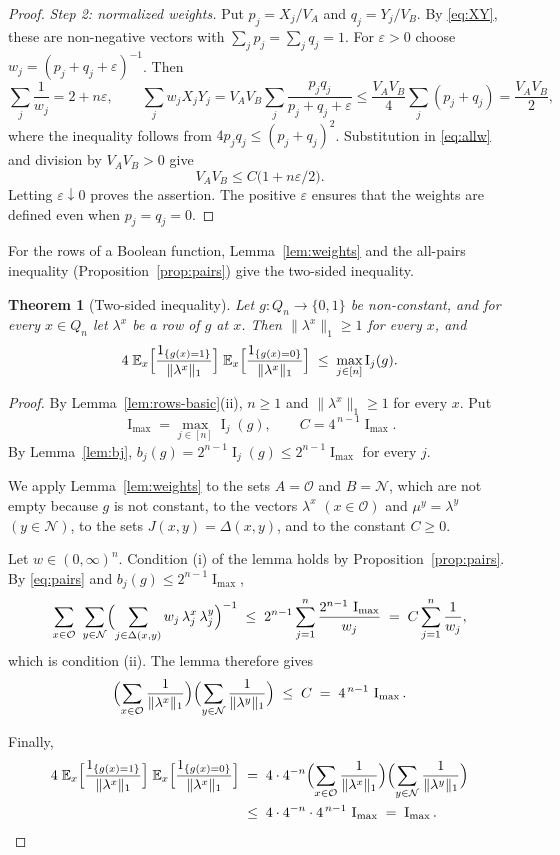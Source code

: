 \documentclass[11pt,reqno]{amsart}
\newtheorem{theorem}{Theorem}[section]
\theoremstyle{definition}
\theoremstyle{remark}
\numberwithin{equation}{section}
\theoremstyle{named}
\theoremstyle{plain}
\newcommand{\E}{\mathbb{E}}
\newcommand{\I}{\operatorname{I}}
\newcommand{\cO}{\mathcal{O}}
\newcommand{\cN}{\mathcal{N}}
\newcommand{\eps}{\varepsilon}
\newcommand{\norm}[1]{\lVert #1\rVert_1}
\begin{document}
\begin{proof}
\smallskip
\emph{Step 2: normalized weights.} Put $p_j=X_j/V_A$ and $q_j=Y_j/V_B$. By
\eqref{eq:XY}, these are non-negative vectors with $\sum_jp_j=\sum_jq_j=1$.
For $\eps>0$ choose $w_j=(p_j+q_j+\eps)^{-1}$. Then
\[
   \sum_j\frac1{w_j}=2+n\eps,\qquad
   \sum_jw_jX_jY_j
   =V_AV_B\sum_j\frac{p_jq_j}{p_j+q_j+\eps}
   \le\frac{V_AV_B}{4}\sum_j(p_j+q_j)=\frac{V_AV_B}{2},
\]
where the inequality follows from $4p_jq_j\le(p_j+q_j)^2$.
Substitution in \eqref{eq:allw} and division by $V_AV_B>0$ give
\[
   V_AV_B\le C\bigl(1+n\eps/2\bigr).
\]
Letting $\eps\downarrow0$ proves the assertion. The positive $\eps$ ensures that the weights
are defined even when $p_j=q_j=0$.
\end{proof}

For the rows of a Boolean function, Lemma~\ref{lem:weights} and the all-pairs inequality (Proposition~\ref{prop:pairs}) give the two-sided
inequality.

\begin{theorem}[Two-sided inequality]\label{thm:two}
Let $g\colon Q_n\to\{0,1\}$ be non-constant, and for every $x\in Q_n$ let $\lambda^{x}$ be a row of
$g$ at $x$. Then $\norm{\lambda^{x}}\ge1$ for every $x$, and
\[
   4\;\E_x\Bigl[\frac{1_{\{g(x)=1\}}}{\norm{\lambda^{x}}}\Bigr]\;
      \E_x\Bigl[\frac{1_{\{g(x)=0\}}}{\norm{\lambda^{x}}}\Bigr]\;\le\;\max_{j\in[n]}\I_j(g).
\]
\end{theorem}

\begin{proof}
By Lemma~\ref{lem:rows-basic}(ii), $n\ge1$ and $\norm{\lambda^{x}}\ge1$ for every $x$. Put
\[
   \I_{\max}=\max_{j\in[n]}\I_j(g),\qquad C=4^{\,n-1}\I_{\max} .
\]
By Lemma~\ref{lem:bj}, $b_j(g)=2^{n-1}\I_j(g)\le2^{n-1}\I_{\max}$ for every $j$.

We apply Lemma~\ref{lem:weights} to the sets $A=\cO$ and $B=\cN$, which are not empty because $g$
is not constant, to the vectors $\lambda^{x}$ $(x\in\cO)$ and $\mu^{y}=\lambda^{y}$ $(y\in\cN)$, to
the sets $J(x,y)=\Delta(x,y)$, and to the constant $C\ge0$.

Let $w\in(0,\infty)^{n}$. Condition (i) of
the lemma holds by Proposition~\ref{prop:pairs}. By \eqref{eq:pairs} and
$b_j(g)\le2^{n-1}\I_{\max}$,
\[
   \sum_{x\in\cO}\ \sum_{y\in\cN}\Bigl(\sum_{j\in\Delta(x,y)}w_j\,\lambda^{x}_j\,\lambda^{y}_j\Bigr)^{-1}
   \;\le\;2^{n-1}\sum_{j=1}^{n}\frac{2^{n-1}\,\I_{\max}}{w_j}\;=\;C\sum_{j=1}^{n}\frac1{w_j},
\]
which is condition (ii). The lemma therefore gives
\[
   \Bigl(\sum_{x\in\cO}\frac1{\norm{\lambda^{x}}}\Bigr)
   \Bigl(\sum_{y\in\cN}\frac1{\norm{\lambda^{y}}}\Bigr)\;\le\;C\;=\;4^{\,n-1}\,\I_{\max}.
\]

Finally,
\begin{align*}
   4\;\E_x\Bigl[\frac{1_{\{g(x)=1\}}}{\norm{\lambda^{x}}}\Bigr]\;
      \E_x\Bigl[\frac{1_{\{g(x)=0\}}}{\norm{\lambda^{x}}}\Bigr]
   &\;=\;4\cdot4^{-n}\Bigl(\sum_{x\in\cO}\frac1{\norm{\lambda^{x}}}\Bigr)
     \Bigl(\sum_{y\in\cN}\frac1{\norm{\lambda^{y}}}\Bigr)\\
   &\;\le\;4\cdot4^{-n}\cdot4^{\,n-1}\,\I_{\max}\;=\;\I_{\max}. \qedhere
\end{align*}
\end{proof}
\end{document}
